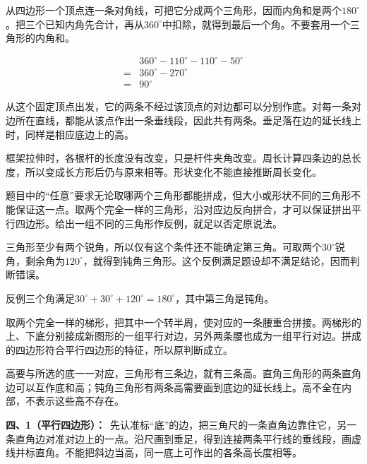 \documentclass[multi=snippet,border=0pt]{standalone}
\newenvironment{snippet}[3]{\begin{minipage}{#1bp}\color{answerred}\fontsize{#2}{#3}\selectfont\raggedright}{\end{minipage}}
\begin{document}
\begin{snippet}{505}{11.5}{14}从四边形一个顶点连一条对角线，可把它分成两个三角形，因而内角和是两个\(180^\circ\)。把三个已知内角先合计，再从\(360^\circ\)中扣除，就得到最后一个角。不要套用一个三角形的内角和。\par \[\begin{aligned}&360^\circ-110^\circ-110^\circ-50^\circ\\={}&360^\circ-270^\circ\\={}&90^\circ\end{aligned}\]\end{snippet}
\begin{snippet}{505}{11.5}{14}从这个固定顶点出发，它的两条不经过该顶点的对边都可以分别作底。对每一条对边所在直线，都能从该点作出一条垂线段，因此共有两条。垂足落在边的延长线上时，同样是相应底边上的高。\end{snippet}
\begin{snippet}{505}{11.5}{14}框架拉伸时，各根杆的长度没有改变，只是杆件夹角改变。周长计算四条边的总长度，所以变成长方形后仍与原来相等。形状变化不能直接推断周长变化。\end{snippet}
\begin{snippet}{505}{11.5}{14}题目中的“任意”要求无论取哪两个三角形都能拼成，但大小或形状不同的三角形不能保证这一点。取两个完全一样的三角形，沿对应边反向拼合，才可以保证拼出平行四边形。给出一组不同的三角形作反例，就足以否定原说法。\end{snippet}
\begin{snippet}{505}{11.5}{14}三角形至少有两个锐角，所以仅有这个条件还不能确定第三角。可取两个\(30^\circ\)锐角，剩余角为\(120^\circ\)，就得到钝角三角形。这个反例满足题设却不满足结论，因而判断错误。\par 反例三个角满足\(30^\circ+30^\circ+120^\circ=180^\circ\)，其中第三角是钝角。\end{snippet}
\begin{snippet}{505}{11.5}{14}取两个完全一样的梯形，把其中一个转半周，使对应的一条腰重合拼接。两梯形的上、下底分别接成新图形的一组平行对边，另外两条腰也成为一组平行对边。拼成的四边形符合平行四边形的特征，所以原判断成立。\end{snippet}
\begin{snippet}{505}{11.5}{14}高要与所选的底一一对应，三角形有三条边，就有三条高。直角三角形的两条直角边可以互作底和高；钝角三角形有两条高需要画到底边的延长线上。高不全在内部，不表示这些高不存在。\end{snippet}
\begin{snippet}{505}{11.5}{14}\textbf{四、1（平行四边形）：}\ 先认准标“底”的边，把三角尺的一条直角边靠住它，另一条直角边对准对边上的一点。沿尺画到垂足，得到连接两条平行线的垂线段，画虚线并标直角。不能把斜边当高，同一底上可作出的各条高长度相等。\end{snippet}
\end{document}
